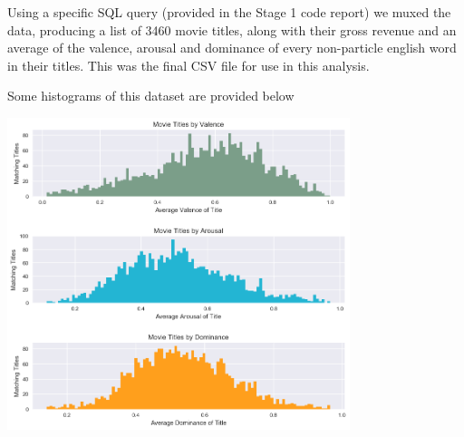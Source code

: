 \documentclass[font=10pt]{article}
\begin{document}
   Using a specific SQL query (provided in the Stage 1 code report) we muxed the data, producing a list of 3460 movie titles, along with their gross revenue and an average of the valence, arousal and dominance of every non-particle english word in their titles. This was the final CSV file for use in this analysis.

Some histograms of this dataset are provided below

\begin{center}
\includegraphics[width=10cm]{Movie_titles_by_vad.png}
\end{center}
\end{document}
